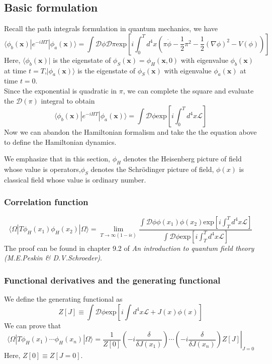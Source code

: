 \subsection{Basic formulation}
\noindent
Recall the path integrals formulation in quantum mechanics, we have
\[\langle \phi_b(\bm{x}) | e^{-iHT} | \phi_a(\bm{x}) \rangle = \int \mathcal{D}\phi \mathcal{D}\pi  \mathrm{exp} \left[ i\int_0^T d^4x (\pi\dot{\phi} - \frac{1}{2}\pi^2 - \frac{1}{2}(\nabla \phi)^2 -V(\phi))\right]\]
Here, $\langle \phi_b(\bm{x}) |$ is the eigenstate of $\phi_S(\bm{x})=\phi_H(\bm{x},0)$ with eigenvalue $\phi_b(\bm{x})$ at time $t=T$,$| \phi_a(\bm{x}) \rangle$ is the eigenstate of $\phi_S(\bm{x})$ with eigenvalue $\phi_a(\bm{x})$ at time $t=0$.\\
Since the exponential is quadratic in $\pi$, we can complete the square and evaluate the $\mathcal{D}(\pi)$ integral to obtain
\[\langle \phi_b(\bm{x}) | e^{-iHT} | \phi_a(\bm{x}) \rangle = \int \mathcal{D}\phi  \mathrm{exp} \left[ i\int_0^T d^4x \mathcal{L} \right]\]
Now we can abandon the Hamiltonian formalism and take the the equation above to define the Hamiltonian dynamics.
\begin{note}
We emphasize that in this section, $\phi_H$ denotes the Heisenberg picture of field whose value is operators,$\phi_S$ denotes the Schr\"{o}dinger picture of field, $\phi(x)$ is classical field whose value is ordinary number.
\end{note}

\subsubsection{Correlation function}
\[\langle \Omega | T \phi_H(x_1) \phi_H(x_2)| \Omega \rangle = \lim_{T \to \infty(1-i\epsilon)} \frac{\int \mathcal{D}\phi \phi(x_1)\phi(x_2) \mathrm{exp} \left[ i\int_T^T d^4x \mathcal{L} \right]}{\int \mathcal{D} \phi \mathrm{exp} \left[ i\int_T^T d^4x \mathcal{L} \right]}\]
The proof can be found in chapter 9.2 of \emph{An introduction to quantum field theory (M.E.Peskin \& D.V.Schroeder)}.

\subsubsection{Functional derivatives and the generating functional}
\noindent
We define the generating functional as
\[Z[J] \equiv \int \mathcal{D} \phi \mathrm{exp} \left[ i\int d^4x \mathcal{L} + J(x)\phi(x) \right]\]
We can prove that
\[\langle \Omega | T \phi_H(x_1) \cdots \phi_H(x_n) | \Omega \rangle = \frac{1}{Z[0]} \left. \left( -i\frac{\delta}{\delta J(x_1)} \right)\cdots \left( -i\frac{\delta}{\delta J(x_n)} \right) Z[J]\right|_{J=0}\]
Here, $Z[0] \equiv Z[J=0]$.

